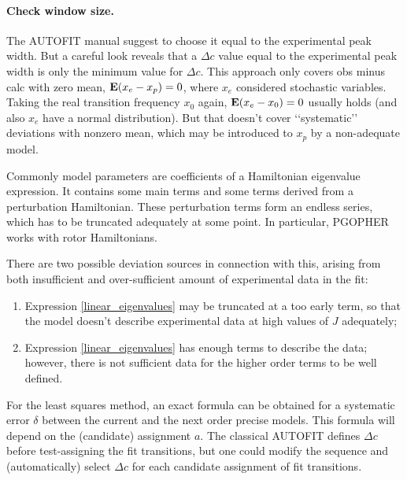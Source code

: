 \documentclass[11pt]{article}
\begin{document}
\paragraph{Check window size.}

The AUTOFIT manual suggest to choose it equal to the experimental peak width. But a careful look reveals that a $\Delta c$ value equal to the experimental peak width is only the minimum value for $\Delta c$. This approach only covers obs minus calc  with zero mean, $\mathbf{E} (x_e - x_p) = 0$, where $x_e$ considered stochastic variables. Taking the real transition frequency $x_0$ again, $\mathbf{E} (x_e - x_0) = 0$ usually holds (and also $x_e$ have a normal distribution). But that doesn't cover \lq\lq{}systematic\rq\rq{} deviations with nonzero mean, which may be introduced to $x_p$ by a non-adequate model.

Commonly  model parameters are coefficients of a Hamiltonian eigenvalue expression. It contains some main terms and some terms derived from a perturbation Hamiltonian. These perturbation terms form an endless series, which has to be truncated adequately at some point. In particular, PGOPHER works with rotor Hamiltonians. 

There are two possible deviation sources in connection with this, arising from both insufficient and over-sufficient amount of experimental data in the fit:
\begin{enumerate}
	\item Expression \ref{linear_eigenvalues} may be truncated at a too early term, so that the model doesn't describe experimental data at high values of $J$ adequately;
	\item Expression \ref{linear_eigenvalues} has enough terms to describe the data; however, there is not sufficient data for the higher order terms to be well defined. 
\end{enumerate}

For the least squares method, an exact formula can be obtained for a systematic error $\delta$ between the current and the next order precise models. This formula will depend on the (candidate) assignment $a$. The classical AUTOFIT defines $\Delta c$ before test-assigning the fit transitions, but one could modify the sequence and (automatically) select $\Delta c$ for each candidate assignment of fit transitions.  

\end{document}
